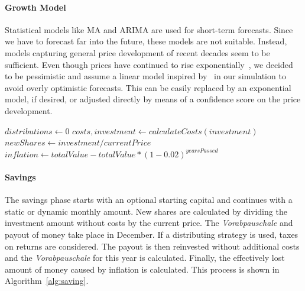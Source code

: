 \documentclass[sigconf%
,natbib=true%
]{acmart}
\begin{document}
\paragraph{Growth Model}
Statistical models like MA and ARIMA are used for short-term forecasts. 
Since we have to forecast far into the future, these models are not suitable.
Instead, models capturing general price development of recent decades seem to be sufficient.
Even though prices have continued to rise exponentially~\cite{leippold2016-index},
we decided to be pessimistic and assume a linear model inspired by~\cite{Nunno2014StockMP} in our simulation to avoid overly optimistic forecasts.
This can be easily replaced by an exponential model, if desired, or adjusted directly by means of a confidence score on the price development.

\begin{algorithm}[b]
    \SetAlCapSkip{-5cm}
    \SetAlgoSkip{}
	\footnotesize
	\selectfont
	\DontPrintSemicolon
	$distributions \gets 0$\;
	$costs, investment \gets calculateCosts(investment)$\;
	$newShares \gets investment / currentPrice$\; 
	$inflation \gets totalValue - totalValue * (1 - 0.02)^{yearsPassed}$\;
	\selectfont
	\caption{Pseudo code of the calculation for a saving month.}%
	\label{alg:saving}
\end{algorithm}

\paragraph{Savings}
The savings phase starts with an optional starting capital and continues with a static or dynamic monthly amount. 
New shares are calculated by dividing the investment amount without costs by the current price. 
The \emph{Vorabpauschale} and payout of money take place in December. 
If a distributing strategy is used, taxes on returns are considered. 
The payout is then reinvested without additional costs and the \emph{Vorabpauschale} for this year is calculated.
Finally, the effectively lost amount of money caused by inflation is calculated.
This process is shown in Algorithm~\ref{alg:saving}.
\end{document}
